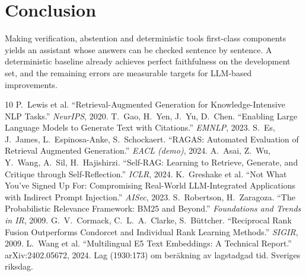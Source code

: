 \documentclass[11pt,a4paper]{article}
\begin{document}
\section{Conclusion}
Making verification, abstention and deterministic tools first-class components yields an assistant whose
answers can be checked sentence by sentence. A deterministic baseline already achieves perfect faithfulness
on the development set, and the remaining errors are measurable targets for LLM-based improvements.

\begin{thebibliography}{10}
 P.~Lewis et al. ``Retrieval-Augmented Generation for Knowledge-Intensive NLP Tasks.'' \emph{NeurIPS}, 2020.
 T.~Gao, H.~Yen, J.~Yu, D.~Chen. ``Enabling Large Language Models to Generate Text with Citations.'' \emph{EMNLP}, 2023.
 S.~Es, J.~James, L.~Espinosa-Anke, S.~Schockaert. ``RAGAS: Automated Evaluation of Retrieval Augmented Generation.'' \emph{EACL (demo)}, 2024.
 A.~Asai, Z.~Wu, Y.~Wang, A.~Sil, H.~Hajishirzi. ``Self-RAG: Learning to Retrieve, Generate, and Critique through Self-Reflection.'' \emph{ICLR}, 2024.
 K.~Greshake et al. ``Not What You've Signed Up For: Compromising Real-World LLM-Integrated Applications with Indirect Prompt Injection.'' \emph{AISec}, 2023.
 S.~Robertson, H.~Zaragoza. ``The Probabilistic Relevance Framework: BM25 and Beyond.'' \emph{Foundations and Trends in IR}, 2009.
 G.~V.~Cormack, C.~L.~A.~Clarke, S.~Büttcher. ``Reciprocal Rank Fusion Outperforms Condorcet and Individual Rank Learning Methods.'' \emph{SIGIR}, 2009.
 L.~Wang et al. ``Multilingual E5 Text Embeddings: A Technical Report.'' arXiv:2402.05672, 2024.
 Lag (1930:173) om beräkning av lagstadgad tid. Sveriges riksdag.
\end{thebibliography}
\end{document}
